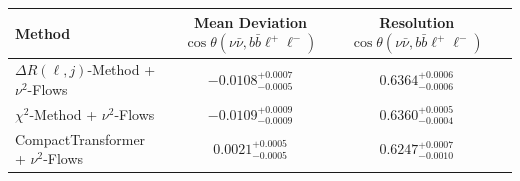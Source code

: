     \begin{tabular}{lccc}
        \toprule
        Method & Mean Deviation $\cos\theta(\nu\bar{\nu}, b\bar{b}\ell^+\ell^-)$ & Resolution $\cos\theta(\nu\bar{\nu}, b\bar{b}\ell^+\ell^-)$ \\
        \midrule
        $\Delta R(\ell,j)$-Method + $\nu^2$-Flows & $-0.0108^{+0.0007}_{-0.0005}$ & $0.6364^{+0.0006}_{-0.0006}$ \\
        $\chi^2$-Method + $\nu^2$-Flows & $-0.0109^{+0.0009}_{-0.0009}$ & $0.6360^{+0.0005}_{-0.0004}$ \\
        CompactTransformer + $\nu^2$-Flows & $0.0021^{+0.0005}_{-0.0005}$ & $0.6247^{+0.0007}_{-0.0010}$ \\
        \bottomrule
    \end{tabular}